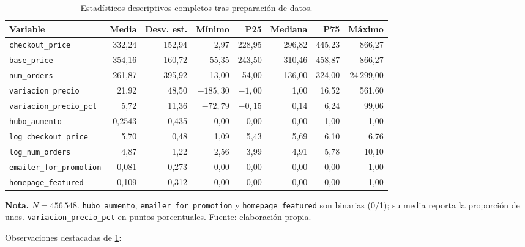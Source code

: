 \documentclass[doc, a4paper, biblatex, floatsintext, longtable, babel]{apa7}
\begin{document}
\begin{table}[!htbp]
\centering
\caption{Estad\'isticos descriptivos completos tras preparaci\'on de datos.}
\label{table:descriptivos_completa}
\scriptsize
\setlength{\tabcolsep}{3pt}
\begin{threeparttable}
\begin{tabular}{@{}lrrrrrrr@{}}\toprule
Variable & Media & Desv. est. & M\'inimo & P25 & Mediana & P75 & M\'aximo \\\midrule
\texttt{checkout\_price} & 332,24 & 152,94 & 2,97 & 228,95 & 296,82 & 445,23 & 866,27 \\
\texttt{base\_price} & 354,16 & 160,72 & 55,35 & 243,50 & 310,46 & 458,87 & 866,27 \\
\texttt{num\_orders} & 261,87 & 395,92 & 13,00 & 54,00 & 136,00 & 324,00 & 24\,299,00 \\
\texttt{variacion\_precio} & 21,92 & 48,50 & $-185,30$ & $-1,00$ & 1,00 & 16,52 & 561,60 \\
\texttt{variacion\_precio\_pct} & 5,72 & 11,36 & $-72,79$ & $-0,15$ & 0,14 & 6,24 & 99,06 \\
\texttt{hubo\_aumento} & 0,2543 & 0,435 & 0,00 & 0,00 & 0,00 & 1,00 & 1,00 \\
\texttt{log\_checkout\_price} & 5,70 & 0,48 & 1,09 & 5,43 & 5,69 & 6,10 & 6,76 \\
\texttt{log\_num\_orders} & 4,87 & 1,22 & 2,56 & 3,99 & 4,91 & 5,78 & 10,10 \\
\texttt{emailer\_for\_promotion} & 0,081 & 0,273 & 0,00 & 0,00 & 0,00 & 0,00 & 1,00 \\
\texttt{homepage\_featured} & 0,109 & 0,312 & 0,00 & 0,00 & 0,00 & 0,00 & 1,00 \\
\bottomrule
\end{tabular}
\begin{tablenotes}
\footnotesize
\item \textbf{Nota.} $N = 456\,548$. \texttt{hubo\_aumento}, \texttt{emailer\_for\_promotion} y \texttt{homepage\_featured} son binarias (0/1); su media reporta la proporción de unos. \texttt{variacion\_precio\_pct} en puntos porcentuales. Fuente: elaboración propia.
\end{tablenotes}
\end{threeparttable}
\end{table}

Observaciones destacadas de \cref{table:descriptivos_completa}:
\end{document}
